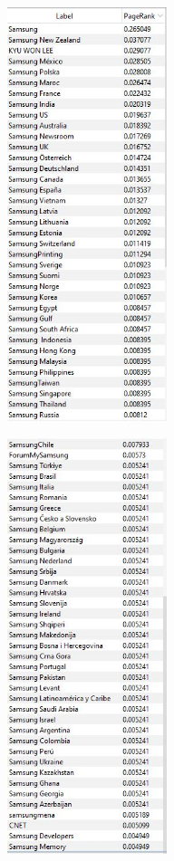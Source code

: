 \documentclass[12pt]{article}
\begin{document}
	\begin{center}
		\begin{adjustbox}{valign=t}
			\includegraphics[width=0.35\textwidth]{photos-files/section13/pagerank_1.JPG}
		\end{adjustbox}
		\hfill
		\begin{adjustbox}{valign=t}
			\includegraphics[width=0.35\textwidth]{photos-files/section13/pagerank_2.JPG}
		\end{adjustbox}
	\end{center}
	
\end{document}
